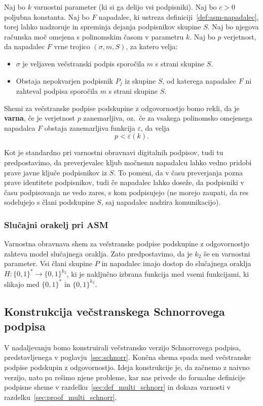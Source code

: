 \begin{definicija}
\label{def:asm-varnost}
    Naj bo $k$ varnostni parameter (ki si ga delijo vsi podpisniki). Naj bo $c > 0$ poljubna konstanta. 
    Naj bo $F$ napadalec, ki ustreza definiciji~\ref{def:asm-napadalec}, torej lahko nadzoruje in
    spreminja dejanja podpisnikov skupine $S$. Naj bo njegova računska moč omejena s polinomskim časom
    v parametru $k$. Naj bo $p$ verjetnost, da napadalec $F$ vrne trojico $(\sigma, m, S)$, za katero velja: 
    \begin{itemize}
        \item $\sigma$ je veljaven večstranski podpis sporočila $m$ s strani skupine $S$.
        \item Obstaja nepokvarjen podpisnik $P_j$ iz skupine $S$, od katerega napadalec $F$ ni zahteval podpisa 
            sporočila $m$ s strani skupine $S$.
    \end{itemize}
    Shemi za večstranske 
    podpise podskupine z odgovornostjo bomo rekli, da je \textbf{varna}, če je verjetnost $p$ zanemarljiva,
    oz.\ če za vsakega polinomsko omejenega napadalca $F$ obstaja zanemarljiva funkcija $\varepsilon$,
    da velja
    $$ 
    p < \varepsilon(k).
    $$
\end{definicija}

Kot je standardno pri varnostni obravnavi digitalnih podpisov, tudi tu predpostavimo, da preverjevalec
kljub močnemu napadalcu lahko vedno pridobi prave javne ključe podpisnikov iz $S$. To pomeni, da
v času preverjanja pozna prave identitete podpisnikov, tudi če napadalec lahko doseže, da podpisniki
v času podpisovanja ne vedo zares, s kom podpisujejo (ne morejo zaupati, da res sodelujejo s člani
podskupine $S$, saj napadalec nadzira komunikacijo).

\subsubsection{Slučajni orakelj pri ASM}
Varnostna obravnava shem za večstranske podpise podskupine z odgovornostjo zahteva model slučajnega
oraklja. Zato predpostavimo, da je $k_2$ še en varnostni parameter. Vsi člani skupine $P$ in
napadalec imajo dostop do slučajnega oraklja $H: \{0, 1\}^* \rightarrow \{0, 1\}^{k_2}$, ki je
naključno izbrana funkcija med vsemi funkcijami, ki slikajo med $\{0, 1\}^*$ in $\{0, 1\}^{k_2}$.

\subsection{Konstrukcija večstranskega Schnorrovega podpisa}
V nadaljevanju bomo konstruirali večstransko verzijo Schnorrovega podpisa, predstavljenega v
poglavju~\ref{sec:schnorr}. Končna shema spada med večstranske podpise podskupin z odgovornostjo.
Ideja konstrukcije je, da začnemo z naivno verzijo, nato pa rešimo njene probleme, kar nas
privede do formalne definicije podpisne sheme v razdelku~\ref{sec:def_multi_schnorr} in dokaza
varnosti v razdelku~\ref{sec:proof_multi_schnorr}.

